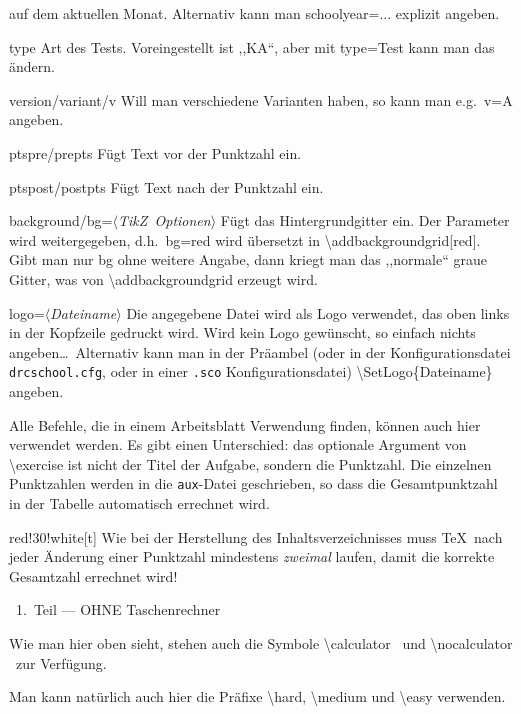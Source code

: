 \documentclass[hyperworksheet]{drcschool}
\newcommand*{\cs}[1]{\textup{\ttfamily\textbackslash#1}}                   %
\newcommand*{\opt}[1]{\textup{\ttfamily#1}}                                %
\newcommand*{\param}[1]{\mbox{\normalfont$\langle$\textit{#1}$\rangle$}}   %
\newcommand*{\TikZ}{\textup{Ti\textit{k}Z}}                                %
\begin{document}
\begin{test}[2,M,class=9a,date=32.\ Oktober 2022,v=A,ptspre=>,ptspost=<,logo=example-image]
\begin{compactdesc}
   auf dem aktuellen Monat. Alternativ kann man \opt{schoolyear=...} explizit angeben.
\item[\ttfamily type] Art des Tests. Voreingestellt ist ,,KA``, aber mit \opt{type=Test} kann man das ändern.
\item[\ttfamily version/variant/v] Will man verschiedene Varianten haben, so kann man
   e.g.~\opt{v=A} angeben.
\item[\ttfamily ptspre/prepts] Fügt Text vor der Punktzahl ein.
\item[\ttfamily ptspost/postpts] Fügt Text nach der Punktzahl ein.
\item[\ttfamily background/bg=\param{\TikZ\ Optionen}] Fügt das Hintergrundgitter ein. Der Parameter wird weitergegeben, d.h.\
   \opt{bg=red} wird übersetzt in \cs{addbackgroundgrid[red]}. Gibt man nur \opt{bg}
   ohne weitere Angabe, dann kriegt man das ,,normale`` graue Gitter, was von
   \cs{addbackgroundgrid} erzeugt wird.
\item[\ttfamily logo=\param{Dateiname}] Die angegebene Datei wird
   als Logo verwendet, das oben links in der Kopfzeile gedruckt wird. Wird kein Logo
   gewünscht, so einfach nichts angeben\ldots\ Alternativ kann man in der Präambel
   (oder in der Konfigurationsdatei \texttt{drcschool.cfg}, oder in einer
   \texttt{.sco} Konfigurationsdatei) \cs{SetLogo\{Dateiname\}} angeben.
\end{compactdesc}

Alle Befehle, die in einem Arbeitsblatt Verwendung finden, können auch hier
verwendet werden. Es gibt einen Unterschied: das optionale Argument von \cs{exercise}
ist nicht der Titel der Aufgabe, sondern die Punktzahl. Die einzelnen Punktzahlen
werden in die \texttt{aux}-Datei geschrieben, so dass die Gesamtpunktzahl in
der Tabelle automatisch errechnet wird.

\noindent
\begin{colorminipage}{red!30!white}[t]{\linewidth}
Wie bei der Herstellung des Inhaltsverzeichnisses muss \TeX\ nach jeder Änderung
einer Punktzahl mindestens \emph{zweimal} laufen, damit die korrekte Gesamtzahl
errechnet wird!
\end{colorminipage}

\begin{center}
\nocalculator\ 1.\ Teil --- OHNE Taschenrechner
\end{center}
Wie man hier oben sieht, stehen auch die Symbole \cs{calculator} \calculator\
und \cs{nocalculator} \nocalculator\ zur Verfügung.

\medium\exercise[0.5]
Man kann natürlich auch hier die Präfixe \cs{hard}, \cs{medium} und \cs{easy} verwenden.


\end{test}
\end{document}
